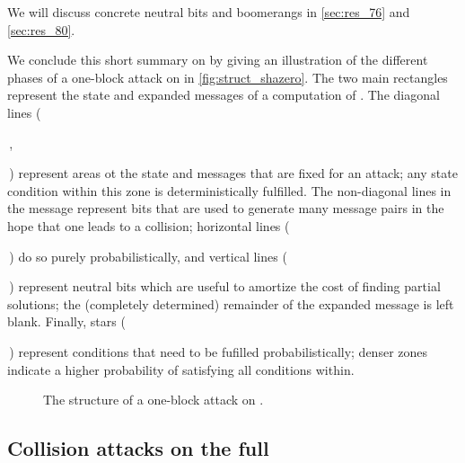 \noindent
We will discuss concrete neutral bits and boomerangs in \autoref{sec:res_76} and \autoref{sec:res_80}.

We conclude this short summary on \shazero by giving an illustration of the different phases of a one-block attack on \shazero in \autoref{fig:struct_shazero}. The two main rectangles represent the state and
expanded messages of a computation of \shazero. The diagonal lines (\,\,,
\,) represent areas ot the state and messages that are fixed for an attack; any state condition within this zone is deterministically fulfilled.
The non-diagonal lines in the message represent bits that are used to generate many message pairs in the hope that one leads to a collision; horizontal lines
(\,\,) do so purely probabilistically, and vertical lines
(\,\,)
represent neutral bits which are useful to amortize the cost of finding partial solutions; the (completely determined) remainder of the expanded message is left blank.
Finally, stars
(\,\,)
represent conditions that need to be fufilled probabilistically; denser zones indicate a higher probability
of satisfying all conditions within. 

\begin{figure}[!htb]
\begin{center}

\end{center}
\caption{The structure of a one-block attack on \shazero.\label{fig:struct_shazero}}
\end{figure}
 
\subsection{Collision attacks on the full \shaone}
\label{sec:full_sha1}

